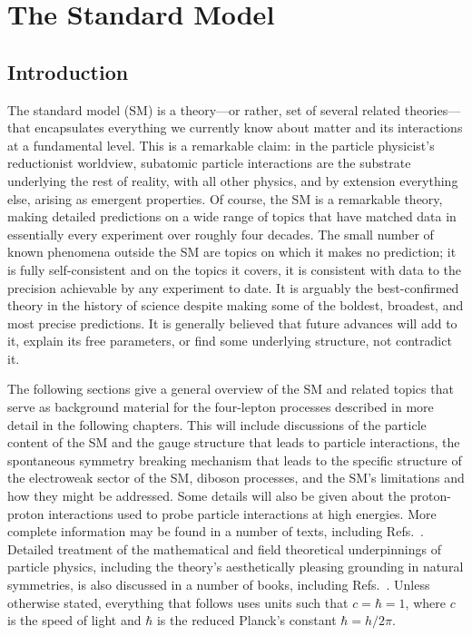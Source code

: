 
\chapter{The Standard Model}

\section{Introduction}

The standard model (SM) is a theory---or rather, set of several related theories---that encapsulates everything we currently know about matter and its interactions at a fundamental level.
This is a remarkable claim: in the particle physicist's reductionist worldview, subatomic particle interactions are the substrate underlying the rest of reality, with all other physics, and by extension everything else, arising as emergent properties.
Of course, the SM is a remarkable theory, making detailed predictions on a wide range of topics that have matched data in essentially every experiment over roughly four decades.
The small number of known phenomena outside the SM are topics on which it makes no prediction; it is fully self-consistent and on the topics it covers, it is consistent with data to the precision achievable by any experiment to date.
It is arguably the best-confirmed theory in the history of science despite making some of the boldest, broadest, and most precise predictions.
It is generally believed that future advances will add to it, explain its free parameters, or find some underlying structure, not contradict it.

The following sections give a general overview of the SM and related topics that serve as background material for the four-lepton processes described in more detail in the following chapters.
This will include discussions of the particle content of the SM and the gauge structure that leads to particle interactions, the spontaneous symmetry breaking mechanism that leads to the specific structure of the electroweak sector of the SM, diboson processes, and the SM's limitations and how they might be addressed.
Some details will also be given about the proton-proton interactions used to probe particle interactions at high energies.
More complete information may be found in a number of texts, including Refs.~\cite{Griffiths:111880,Halzen:1984mc,Peskin:1995ev}.
Detailed treatment of the mathematical and field theoretical underpinnings of particle physics, including the theory's aesthetically pleasing grounding in natural symmetries, is also discussed in a number of books, including Refs.~\cite{Halzen:1984mc,Peskin:1995ev,Srednicki:1019751,Donoghue:238727}.
Unless otherwise stated, everything that follows uses units such that $c = \hbar = 1$, where $c$ is the speed of light and $\hbar$ is the reduced Planck's constant $\hbar = h / 2\pi$.



